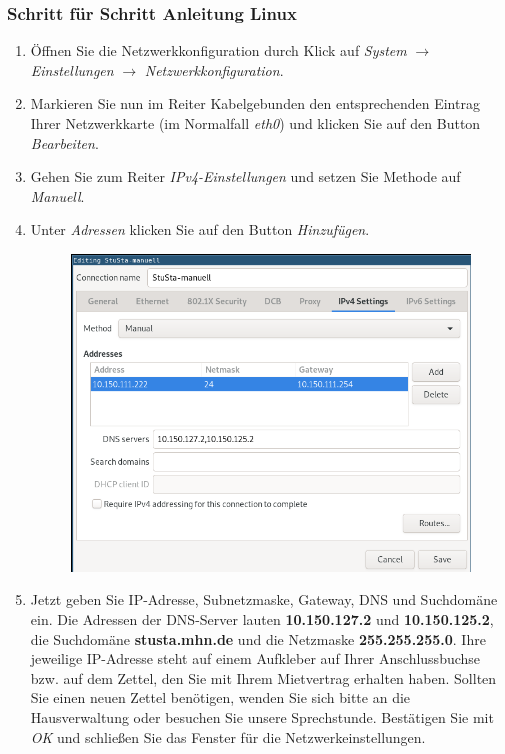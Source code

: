 \documentclass[a4paper,12pt]{scrartcl}
\begin{document}
\subsubsection*{Schritt für Schritt Anleitung Linux}

\begin{enumerate}
	\item Öffnen Sie die Netzwerkkonfiguration durch Klick auf \emph{System} $\rightarrow$ \emph{Einstellungen} $\rightarrow$ \emph{Netzwerkkonfiguration}.
	\item Markieren Sie nun im Reiter Kabelgebunden den entsprechenden Eintrag Ihrer Netzwerkkarte (im Normalfall \emph{eth0}) und klicken Sie auf den Button \emph{Bearbeiten}.
	\item Gehen Sie zum Reiter \emph{IPv4-Einstellungen} und setzen Sie Methode auf \emph{Manuell}.
	\item Unter \emph{Adressen} klicken Sie auf den Button \emph{Hinzufügen}.
	\begin{figure}[h!]
	\centering
		\begin{minipage}[c]{0.5\linewidth}
			\centering
			\includegraphics[width=0.9\linewidth,keepaspectratio]{Bilder/IP_Ubuntu_neu}
			\vspace{-15pt}
		\end{minipage}
	\end{figure}
	\item Jetzt geben Sie IP-Adresse, Subnetzmaske, Gateway, DNS und Suchdomäne ein. Die Adressen der DNS-Server lauten \textbf{10.150.127.2} und \textbf{10.150.125.2}, die Suchdomäne \textbf{stusta.mhn.de} und die Netzmaske \textbf{255.255.255.0}. Ihre jeweilige IP-Adresse steht auf einem Aufkleber auf Ihrer Anschlussbuchse bzw. auf dem Zettel, den Sie mit Ihrem Mietvertrag erhalten haben. Sollten Sie einen neuen Zettel benötigen, wenden Sie sich bitte an die Hausverwaltung oder besuchen Sie unsere Sprechstunde. Bestätigen Sie mit \emph{OK} und schließen Sie das Fenster für die Netzwerkeinstellungen.
\end{enumerate}
\end{document}
